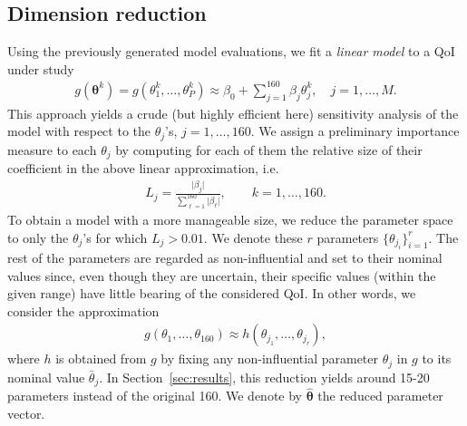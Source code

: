 \subsection{Dimension reduction}
Using the previously generated model evaluations, we fit a {\sl linear model} to a QoI under study
\begin{eqnarray}
g(\boldsymbol\theta^k) = g(\theta_1^k, \dots, \theta_P^k) \approx \beta_0 + \sum\limits_{j=1}^{160} \beta_j \theta_j^k, \quad j=1, \dots, M. \label{lr}
\end{eqnarray}
This approach yields a crude (but highly efficient here) sensitivity analysis of the model with respect to the $\theta_j$'s, $j=1,\dots, 160$. We assign a preliminary importance measure to each $\theta_j$ by computing for each of them the relative size of their coefficient in the above linear approximation, i.e.
\begin{eqnarray*}
L_j = \frac{\vert \beta_j \vert}{\sum\limits_{\ell=1}^{160} \vert \beta_\ell \vert}, \qquad k=1,\dots,160.
\end{eqnarray*}
To obtain a model with a more manageable size, we reduce the parameter space to only the $\theta_j$'s for which $L_j>0.01$. We denote these $r$ parameters $\{ \theta_{j_i}\}_{i=1}^r$. The rest of the parameters are regarded as non-influential and set to their nominal values since, even though they are uncertain, their specific values (within the given range) have little bearing of the considered QoI. In other words, we consider the approximation 
\begin{eqnarray}
g(\theta_1, \dots, \theta_{160}) \approx h(\theta_{j_1}, \dots, \theta_{j_r}), \label{reddim}
\end{eqnarray}
where $h$ is obtained from $g$ by fixing any non-influential parameter $\theta_j$ in $g$  to its nominal value $\bar\theta_j$. In Section~\ref{sec:results}, this reduction yields around 15-20 parameters instead of the original 160. We denote by $\hat{\boldsymbol{\theta}}$ the reduced parameter vector. 

